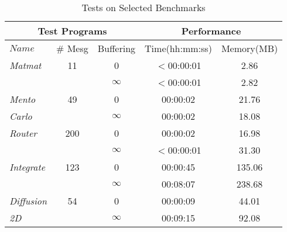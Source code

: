 \begin{table}[t]
\begin{center}
\scriptsize
\caption{Tests on Selected Benchmarks}
\begin{tabular}{|l|c|c|c|c|}
		\hline
         \multicolumn{3}{|c|}{Test Programs} & \multicolumn{2}{|c|}{Performance} \\ \hline
          $Name$&\# Mesg&Buffering&Time(hh:mm:ss)&Memory(MB) \\ \hline
          \textit{Matmat} & 11 & 0 & $<$00:00:01 & 2.86\\
          	      & &  $\infty$ & $<$00:00:01 & 2.82\\ \hline
	 \textit{Mento} & 49 & 0 & 00:00:02 & 21.76\\
          \textit{Carlo}    & & $\infty$ & 00:00:02 & 18.08 \\ \hline
	 \textit{Router}   & 200 & 0 & 00:00:02 & 16.98\\
          	      & & $\infty$ & $<$00:00:01 & 31.30 \\ \hline
	 \textit{Integrate}  & 123 & 0 & 00:00:45 & 135.06 \\
          	      & & $\infty$ & 00:08:07 & 238.68\\ \hline
	  \textit{Diffusion}  & 54 & 0 & 00:00:09 & 44.01 \\
           \textit{2D} &  & $\infty$ & 00:09:15 & 92.08\\ \hline          
          		\end{tabular}
\end{center}
\end{table}


